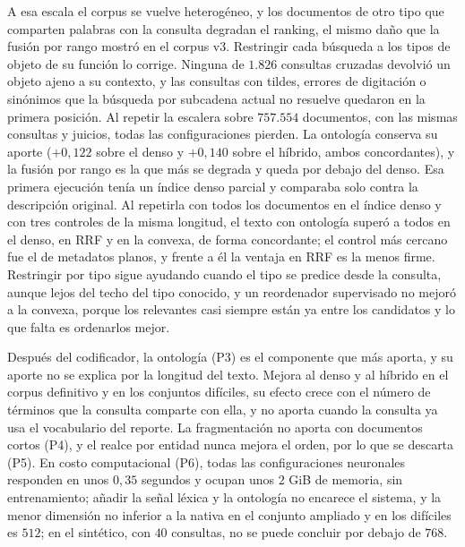 \documentclass[11pt,letterpaper]{article}
\numberwithin{equation}{section}
\begin{document}
A esa escala el corpus se vuelve heterogéneo, y los documentos de otro tipo que comparten palabras con la consulta degradan el ranking, el mismo daño que la fusión por rango mostró en el corpus v3. Restringir cada búsqueda a los tipos de objeto de su función lo corrige. Ninguna de $1.826$ consultas cruzadas devolvió un objeto ajeno a su contexto, y las consultas con tildes, errores de digitación o sinónimos que la búsqueda por subcadena actual no resuelve quedaron en la primera posición. Al repetir la escalera sobre $757.554$ documentos, con las mismas consultas y juicios, todas las configuraciones pierden. La ontología conserva su aporte ($+0{,}122$ sobre el denso y $+0{,}140$ sobre el híbrido, ambos concordantes), y la fusión por rango es la que más se degrada y queda por debajo del denso. Esa primera ejecución tenía un índice denso parcial y comparaba solo contra la descripción original. Al repetirla con todos los documentos en el índice denso y con tres controles de la misma longitud, el texto con ontología superó a todos en el denso, en RRF y en la convexa, de forma concordante; el control más cercano fue el de metadatos planos, y frente a él la ventaja en RRF es la menos firme. Restringir por tipo sigue ayudando cuando el tipo se predice desde la consulta, aunque lejos del techo del tipo conocido, y un reordenador supervisado no mejoró a la convexa, porque los relevantes casi siempre están ya entre los candidatos y lo que falta es ordenarlos mejor.

Después del codificador, la ontología (P3) es el componente que más aporta, y su aporte no se explica por la longitud del texto. Mejora al denso y al híbrido en el corpus definitivo y en los conjuntos difíciles, su efecto crece con el número de términos que la consulta comparte con ella, y no aporta cuando la consulta ya usa el vocabulario del reporte. La fragmentación no aporta con documentos cortos (P4), y el realce por entidad nunca mejora el orden, por lo que se descarta (P5). En costo computacional (P6), todas las configuraciones neuronales responden en unos $0{,}35$ segundos y ocupan unos $2$ GiB de memoria, sin entrenamiento; añadir la señal léxica y la ontología no encarece el sistema, y la menor dimensión no inferior a la nativa en el conjunto ampliado y en los difíciles es $512$; en el sintético, con $40$ consultas, no se puede concluir por debajo de $768$.
\end{document}
